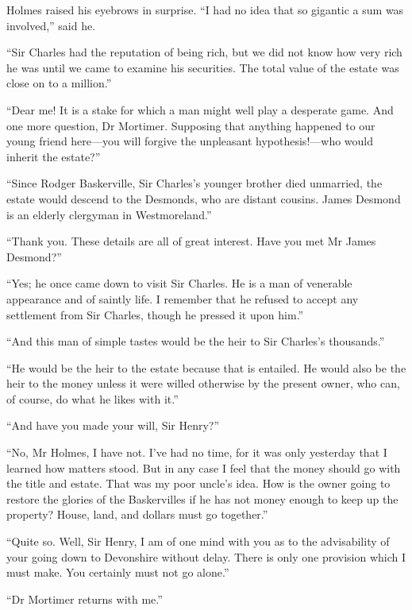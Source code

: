 \documentclass[paper=5.5in:8.5in,BCOR=7mm,twoside,DIV=calc,12pt,usegeometry,openany,chapterprefix,endperiod,headings=big]{scrbook} %
\begin{document}
Holmes raised his eyebrows in surprise. \enquote{I had no idea that so gigantic a sum was involved,} said he.

\enquote{Sir Charles had the reputation of being rich, but we did not know how very rich he was until we came to examine his securities. The total value of the estate was close on to a million.}

\enquote{Dear me! It is a stake for which a man might well play a desperate game. And one more question, Dr Mortimer. Supposing that anything happened to our young friend here---you will forgive the unpleasant hypothesis!---who would inherit the estate?}

\enquote{Since Rodger Baskerville, Sir Charles's younger brother died unmarried, the estate would descend to the Desmonds, who are distant cousins. James Desmond is an elderly clergyman in Westmoreland.}

\enquote{Thank you. These details are all of great interest. Have you met Mr James Desmond?}

\enquote{Yes; he once came down to visit Sir Charles. He is a man of venerable appearance and of saintly life. I remember that he refused to accept any settlement from Sir Charles, though he pressed it upon him.}

\enquote{And this man of simple tastes would be the heir to Sir Charles's thousands.}

\enquote{He would be the heir to the estate because that is entailed. He would also be the heir to the money unless it were willed otherwise by the present owner, who can, of course, do what he likes with it.}




\enquote{And have you made your will, Sir Henry?}

\enquote{No, Mr Holmes, I have not. I've had no time, for it was only yesterday that I learned how matters stood. But in any case I feel that the money should go with the title and estate. That was my poor uncle's idea. How is the owner going to restore the glories of the Baskervilles if he has not money enough to keep up the property? House, land, and dollars must go together.}

\enquote{Quite so. Well, Sir Henry, I am of one mind with you as to the advisability of your going down to Devonshire without delay. There is only one provision which I must make. You certainly must not go alone.}

\enquote{Dr Mortimer returns with me.}
\end{document}
